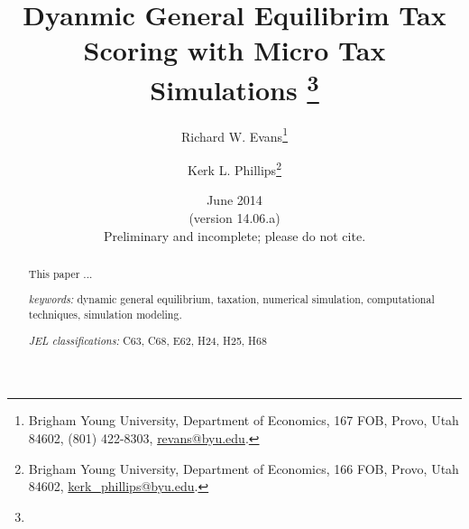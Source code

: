 \documentclass[letterpaper,12pt]{article}
\theoremstyle{definition}
\numberwithin{equation}{section}
\begin{document}
\begin{titlepage}
  \title{Dyanmic General Equilibrim Tax Scoring with Micro Tax Simulations
         \thanks{} }

  \author{ Richard W. Evans\footnote{Brigham Young University, Department of Economics, 167 FOB, Provo, Utah 84602, (801) 422-8303, \href{mailto:revans@byu.edu}{revans@byu.edu}.} \\[-2pt]
         \and
         Kerk L. Phillips\footnote{Brigham Young University, Department of Economics, 166 FOB, Provo, Utah 84602, \href{mailto:kerk_phillips@byu.edu}{kerk\_phillips@byu.edu}.} \\[-2pt]}
  \date{June 2014 \\
        \scriptsize{(version 14.06.a)}\\
        \small Preliminary and incomplete; please do not cite.}
  \maketitle
  \begin{abstract}
  \small{This paper ...

  \vspace{0.3in}

  \textit{keywords:} dynamic general equilibrium, taxation, numerical simulation, computational techniques, simulation modeling.

  \vspace{0.3in}

  \textit{JEL classifications:} C63, C68, E62, H24, H25, H68}
  \end{abstract}
  \thispagestyle{empty}
\end{titlepage}
\end{document}
